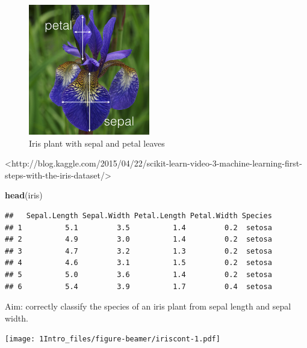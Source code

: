 \documentclass[10pt,ignorenonframetext,]{beamer}
\newenvironment{Shaded}{\begin{snugshade}}{\end{snugshade}}
\newcommand{\KeywordTok}[1]{\textcolor[rgb]{0.13,0.29,0.53}{\textbf{#1}}}
\newcommand{\NormalTok}[1]{#1}
\begin{document}
\begin{frame}

\begin{figure}
\includegraphics[width=150pt]{iris} \caption{Iris plant with sepal and petal leaves}\label{fig:iris_pic}
\end{figure}

\tiny
<http://blog.kaggle.com/2015/04/22/scikit-learn-video-3-machine-learning-first-steps-with-the-iris-dataset/>

\end{frame}

\begin{frame}[fragile]

\scriptsize

\begin{Shaded}
\begin{Highlighting}[]
\KeywordTok{head}\NormalTok{(iris)}
\end{Highlighting}
\end{Shaded}

\begin{verbatim}
##   Sepal.Length Sepal.Width Petal.Length Petal.Width Species
## 1          5.1         3.5          1.4         0.2  setosa
## 2          4.9         3.0          1.4         0.2  setosa
## 3          4.7         3.2          1.3         0.2  setosa
## 4          4.6         3.1          1.5         0.2  setosa
## 5          5.0         3.6          1.4         0.2  setosa
## 6          5.4         3.9          1.7         0.4  setosa
\end{verbatim}

\normalsize

\end{frame}

\begin{frame}

Aim: correctly classify the species of an iris plant from sepal length
and sepal width.

\texttt{[image: 1Intro\_files/figure-beamer/iriscont-1.pdf]}

\end{frame}
\end{document}
